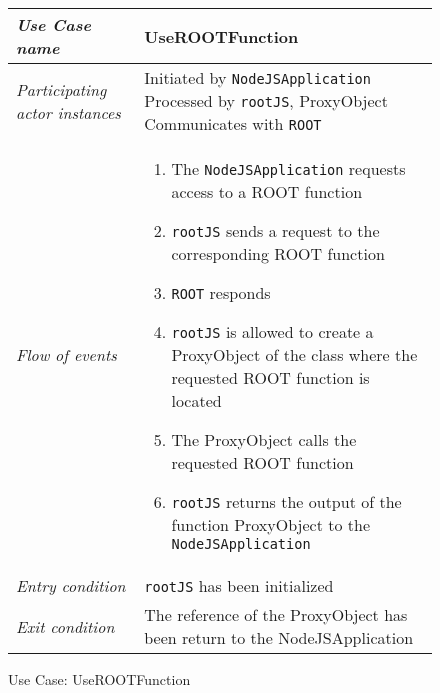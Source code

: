 \begin{figure}[htb]
	\centering
	\begin{longtable}{p{3cm} @{\hskip 1cm} p{12cm}}
		\hline
		
		\textit{Use Case name} & UseROOTFunction\\
		\hline
		
		\textit{Participating actor instances} & Initiated by \texttt{NodeJSApplication}
                Processed by \texttt{rootJS}, ProxyObject
                Communicates with \texttt{ROOT}\\
		\hline
		
		\textit{Flow of events} &
			\begin{enumerate}
				\item The \texttt{NodeJSApplication}  requests access to a ROOT function
				\item \texttt{rootJS} sends a request to the corresponding ROOT function
				\item \texttt{ROOT}  responds
				\item \texttt{rootJS} is allowed to create a ProxyObject of the class where the requested ROOT function is located
				\item The ProxyObject calls the requested ROOT function
				\item \texttt{rootJS} returns the output of the function ProxyObject to the 
				\texttt{NodeJSApplication}
			\end{enumerate}
			\\
		\hline
		
		\textit{Entry condition} & \texttt{rootJS} has been initialized\\
		\hline
		
		\textit{Exit condition} & The reference of the ProxyObject has been return to the NodeJSApplication\\
        \hline
	\end{longtable}
	
	\caption{Use Case: UseROOTFunction}
\end{figure}

